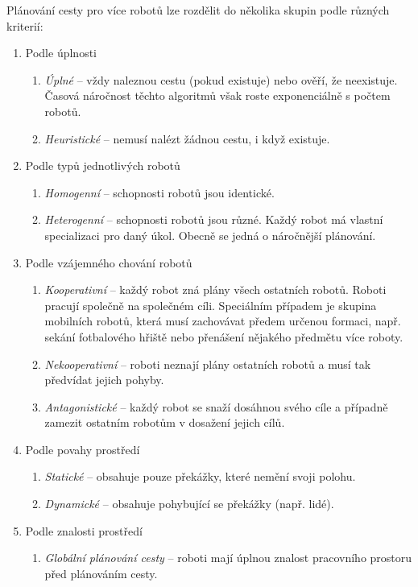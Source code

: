 Plánování cesty pro více robotů lze rozdělit do několika skupin podle různých kriterií:
\begin{enumerate}
	\item Podle úplnosti
	\begin{enumerate}
		\item \emph{Úplné} -- vždy naleznou cestu (pokud existuje) nebo ověří, že neexistuje. Časová náročnost těchto algoritmů však roste exponenciálně s počtem robotů.
		\item \emph{Heuristické} -- nemusí nalézt žádnou cestu, i když existuje.
	\end{enumerate}
	\item Podle typů jednotlivých robotů
	\begin{enumerate}
		\item \emph{Homogenní} -- schopnosti robotů jsou identické.
		\item \emph{Heterogenní} -- schopnosti robotů jsou různé. Každý robot má vlastní specializaci pro daný úkol. Obecně se jedná o náročnější plánování.
	\end{enumerate}
	\item Podle vzájemného chování robotů
	\begin{enumerate}
		\item \emph{Kooperativní} -- každý robot zná plány všech ostatních robotů. Roboti pracují společně na společném cíli. Speciálním případem je skupina mobilních robotů, která musí zachovávat předem určenou formaci, např. sekání fotbalového hřiště nebo přenášení nějakého předmětu více roboty.
		\item \emph{Nekooperativní} -- roboti neznají plány ostatních robotů a musí tak předvídat jejich pohyby.
		\item \emph{Antagonistické} -- každý robot se snaží dosáhnou svého cíle a případně zamezit ostatním robotům v dosažení jejich cílů.
	\end{enumerate}
	\item Podle povahy prostředí
	\begin{enumerate}
		\item \emph{Statické} -- obsahuje pouze překážky, které nemění svoji polohu.
		\item \emph{Dynamické} -- obsahuje pohybující se překážky (např. lidé).
	\end{enumerate}
	\item Podle znalosti prostředí
	\begin{enumerate}
		\item \emph{Globální plánování cesty} -- roboti mají úplnou znalost pracovního prostoru před plánováním cesty.

\end{enumerate}
\end{enumerate}

